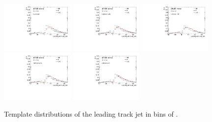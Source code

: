 \begin{figure}[htbp]
  \centering
 \includegraphics[width=0.32\textwidth]{figures/gbb/Sub_Sd0_Fits/Canv_FitTemplate_0-Deltaphi-0628_LpT_INF_SpT_INF_x.pdf}
 \includegraphics[width=0.32\textwidth]{figures/gbb/Sub_Sd0_Fits/Canv_FitTemplate_0628-Deltaphi-1256_LpT_INF_SpT_INF_x.pdf}
 \includegraphics[width=0.32\textwidth]{figures/gbb/Sub_Sd0_Fits/Canv_FitTemplate_1256-Deltaphi-1884_LpT_INF_SpT_INF_x.pdf}\\
 \includegraphics[width=0.32\textwidth]{figures/gbb/Sub_Sd0_Fits/Canv_FitTemplate_1884-Deltaphi-2512_LpT_INF_SpT_INF_x.pdf}
 \includegraphics[width=0.32\textwidth]{figures/gbb/Sub_Sd0_Fits/Canv_FitTemplate_2512-Deltaphi-3140_LpT_INF_SpT_INF_x.pdf}

\caption{Template \subsdzero distributions of the leading track jet in bins of \dphi. }
  \label{fig:dphi-template-leading}
\end{figure}


